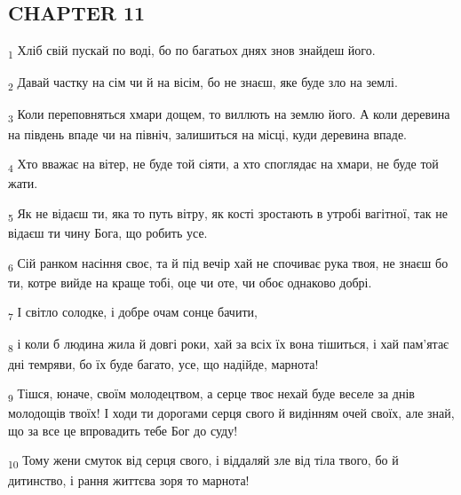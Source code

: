 \subsection{CHAPTER 11}
\begin{tcolorbox}
\textsubscript{1} Хліб свій пускай по воді, бо по багатьох днях знов знайдеш його.
\end{tcolorbox}
\begin{tcolorbox}
\textsubscript{2} Давай частку на сім чи й на вісім, бо не знаєш, яке буде зло на землі.
\end{tcolorbox}
\begin{tcolorbox}
\textsubscript{3} Коли переповняться хмари дощем, то виллють на землю його. А коли деревина на південь впаде чи на північ, залишиться на місці, куди деревина впаде.
\end{tcolorbox}
\begin{tcolorbox}
\textsubscript{4} Хто вважає на вітер, не буде той сіяти, а хто споглядає на хмари, не буде той жати.
\end{tcolorbox}
\begin{tcolorbox}
\textsubscript{5} Як не відаєш ти, яка то путь вітру, як кості зростають в утробі вагітної, так не відаєш ти чину Бога, що робить усе.
\end{tcolorbox}
\begin{tcolorbox}
\textsubscript{6} Сій ранком насіння своє, та й під вечір хай не спочиває рука твоя, не знаєш бо ти, котре вийде на краще тобі, оце чи оте, чи обоє однаково добрі.
\end{tcolorbox}
\begin{tcolorbox}
\textsubscript{7} І світло солодке, і добре очам сонце бачити,
\end{tcolorbox}
\begin{tcolorbox}
\textsubscript{8} і коли б людина жила й довгі роки, хай за всіх їх вона тішиться, і хай пам'ятає дні темряви, бо їх буде багато, усе, що надійде, марнота!
\end{tcolorbox}
\begin{tcolorbox}
\textsubscript{9} Тішся, юначе, своїм молодецтвом, а серце твоє нехай буде веселе за днів молодощів твоїх! І ходи ти дорогами серця свого й видінням очей своїх, але знай, що за все це впровадить тебе Бог до суду!
\end{tcolorbox}
\begin{tcolorbox}
\textsubscript{10} Тому жени смуток від серця свого, і віддаляй зле від тіла твого, бо й дитинство, і рання життєва зоря то марнота!
\end{tcolorbox}
